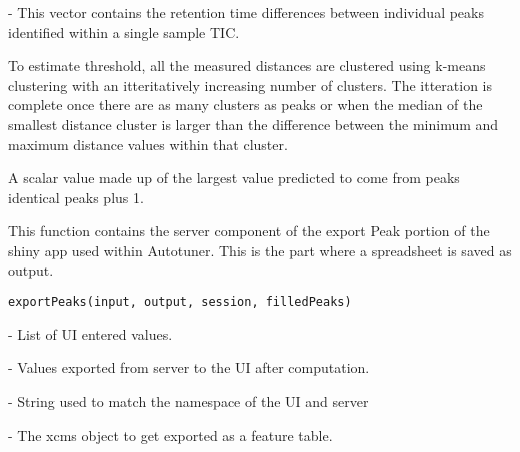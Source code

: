 \documentclass[a4paper]{book}
\begin{document}
%
\begin{Arguments}
\begin{ldescription}
\item[\code{distance\_vector}] - This vector contains the retention time differences
between individual peaks identified within a single sample TIC.
\end{ldescription}
\end{Arguments}
%
\begin{Details}\relax
To estimate threshold, all the measured distances are clustered
using k-means clustering with an itteritatively increasing number of
clusters. The itteration is complete once there are as many clusters as
peaks or when the median of the smallest distance cluster is larger than the
difference between the minimum and maximum distance values within that
cluster.
\end{Details}
%
\begin{Value}
A scalar value made up of the largest value predicted to come from
peaks identical peaks plus 1.
\end{Value}
%
\begin{Description}\relax
This function contains the server component of the export Peak
portion of the shiny app used within Autotuner. This is the part where a
spreadsheet is saved as output.
\end{Description}
%
\begin{Usage}
\begin{verbatim}
exportPeaks(input, output, session, filledPeaks)
\end{verbatim}
\end{Usage}
%
\begin{Arguments}
\begin{ldescription}
\item[\code{input}] - List of UI entered values.

\item[\code{output}] - Values exported from server to the UI after computation.

\item[\code{session}] - String used to match the namespace of the UI and server

\item[\code{filledPeaks}] - The xcms object to get exported as a feature table.
\end{ldescription}
\end{Arguments}
\end{document}
